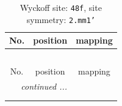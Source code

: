 \documentclass[fleqn,8pt]{jsarticle}
\begin{document}
\renewcommand{\arraystretch}{1.2}
\begin{longtable}{ccc}
\caption{Wyckoff site: {\tt 48f}, site symmetry: {\tt 2.mm1'}}
 \\
 \hline \hline
No. & position & mapping \\ \hline \endfirsthead

\multicolumn{2}{l}{\tablename\ \thetable{}} \\
 \hline \hline
No. & position & mapping \\ \hline \endhead

 \hline \hline
\multicolumn{2}{r}{\footnotesize\it continued ...} \\ \endfoot

 \hline \hline
\multicolumn{2}{r}{} \\ \endlastfoot


\end{longtable}
\end{document}
